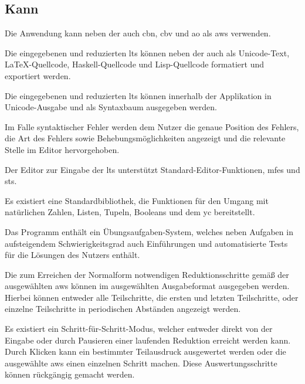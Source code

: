 \documentclass[parskip=full,11pt,twoside]{scrartcl}
\begin{document}

\subsection{Kann}

Die Anwendung kann neben der  auch \gls{cbn}, \gls{cbv}
und \gls{ao} als \gls{aws} verwenden.

Die eingegebenen und reduzierten \glspl{lt} können neben der 
auch als Unicode-Text, \LaTeX-Quellcode, Haskell-Quellcode und Lisp-Quellcode formatiert und exportiert
werden.

Die eingegebenen und reduzierten \glspl{lt} können innerhalb der Applikation in Unicode-Ausgabe und als Syntaxbaum
ausgegeben werden.

Im Falle syntaktischer Fehler werden dem Nutzer die genaue Position des Fehlers, die
Art des Fehlers sowie Behebungsmöglichkeiten angezeigt und die relevante Stelle im
Editor hervorgehoben.

Der Editor zur Eingabe der \glspl{lt} unterstützt Standard-Editor-Funktionen,
\glspl{mfe} und \glspl{st}.

Es existiert eine Standardbibliothek, die Funktionen für den Umgang mit natürlichen
Zahlen, Listen, Tupeln, Booleans und dem \gls{yc} bereitstellt.

Das Programm enthält ein Übungsaufgaben-System, welches neben Aufgaben in aufsteigendem
Schwierigkeitsgrad auch Einführungen und automatisierte Tests für die Lösungen des Nutzers
enthält.

Die zum Erreichen der Normalform notwendigen Reduktionsschritte gemäß der ausgewählten
\gls{aws} können im ausgewählten Ausgabeformat ausgegeben werden. Hierbei
können entweder alle Teilschritte, die ersten und letzten Teilschritte, oder
einzelne Teilschritte in periodischen Abständen angezeigt werden.

Es existiert ein Schritt-für-Schritt-Modus, welcher entweder direkt von der Eingabe
oder durch Pausieren einer laufenden Reduktion erreicht werden kann.
Durch Klicken kann ein bestimmter Teilausdruck ausgewertet werden oder die ausgewählte
\gls{aws} einen einzelnen Schritt machen. Diese Auswertungsschritte können rückgängig
gemacht werden.
\end{document}
